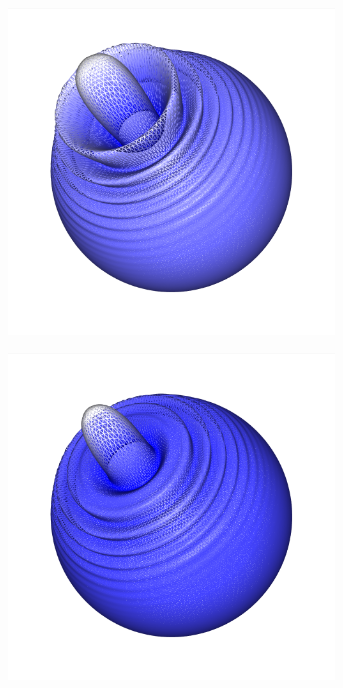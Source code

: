 \documentclass[crop=false]{standalone}
\begin{document}
    \begin{figure}[h]
      \center
      \begin{subfigure}[b]{0.24\textwidth}
        \center
        \includegraphics[trim={2.12cm 2.33cm 2.2cm 0cm},clip,width=0.95\textwidth]{images/sphere_wave_0.png}
        \caption{}
      \end{subfigure}
      \begin{subfigure}[b]{0.24\textwidth}
        \center
        \includegraphics[trim={2.12cm 2.33cm 2.2cm 0cm},clip,width=0.95\textwidth]{images/sphere_wave_1.png}

\end{subfigure}
\end{figure}
\end{document}
